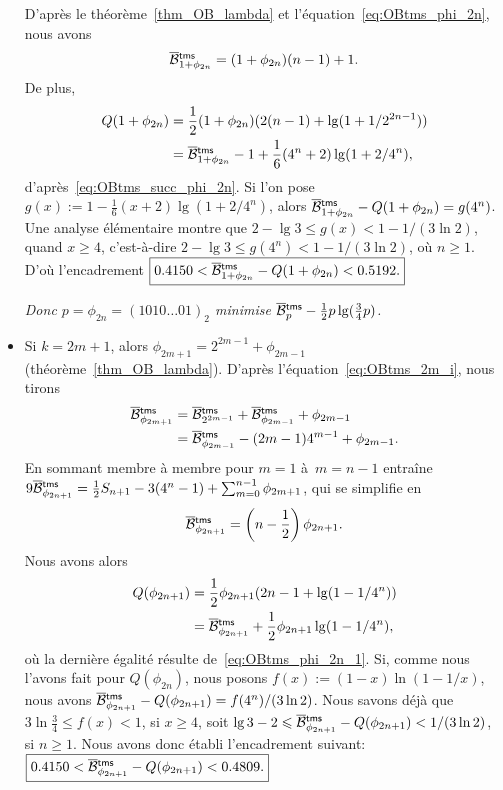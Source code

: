 \begin{itemize}
    D'après le théorème~\ref{thm_OB_lambda} et
    l'équation~\eqref{eq:OBtms_phi_2n}, nous avons
    \begin{equation}
      \OB{\fun{tms}}{1+\phi_{2n}} = (1+\phi_{2n})(n-1) + 1.
      \label{eq:OBtms_succ_phi_2n}
    \end{equation}
    De plus,
    \begin{align*}
      Q(1+\phi_{2n}) &= \frac{1}{2}(1+\phi_{2n}) (2(n-1) + \lg(1+1/2^{2n-1}))\\
                    &= \OB{\fun{tms}}{1+\phi_{2n}} - 1 +
      \frac{1}{6}(4^n + 2)\lg(1+2/4^n),
    \end{align*}
    d'après~\eqref{eq:OBtms_succ_phi_2n}. Si l'on pose \(g(x) := 1 -
    \tfrac{1}{6}(x+2)\lg(1+2/4^n)\), alors
    \(\OB{\fun{tms}}{1+\phi_{2n}} - Q(1+\phi_{2n}) = g(4^n)\). Une
    analyse élémentaire montre que \(2 - \lg 3 \leqslant g(x) < 1 -
    1/(3\ln 2)\), quand \(x \geqslant 4\), c'est-à-dire \(2 - \lg 3
    \leqslant g(4^n) < 1 - 1/(3\ln 2)\), où \(n \geqslant 1\). D'où
    l'encadrement \(\boxed{0.4150 < \OB{\fun{tms}}{1+\phi_{2n}} -
      Q(1+\phi_{2n}) < 0.5192.}\)

  \bigskip
  \textsl{Donc \(p=\phi_{2n} = (1010\dots01)_2\) minimise
      \(\OB{\fun{tms}}{p} - \tfrac{1}{2}p\lg(\tfrac{3}{4}p)\).}
  \bigskip

  \item Si \(k=2m+1\), alors \(\phi_{2m+1} = 2^{2m-1} + \phi_{2m-1}\)
    (théorème~\ref{thm_OB_lambda}). D'après
    l'équation~\eqref{eq:OBtms_2m_i}, nous tirons
    \begin{align*}
      \OB{\fun{tms}}{\phi_{2m+1}} &= \OB{\fun{tms}}{2^{2m-1}} +
      \OB{\fun{tms}}{\phi_{2m-1}} + \phi_{2m-1}\\
      &= \OB{\fun{tms}}{\phi_{2m-1}} - (2m-1)4^{m-1} + \phi_{2m-1}.
    \end{align*}
    En sommant membre à membre pour \(m=1\) à~\(m=n-1\) entraîne
    \(9\OB{\fun{tms}}{\phi_{2n+1}} = \tfrac{1}{2}S_{n+1} - 3(4^n-1) +
    \sum_{m=0}^{n-1}\phi_{2m+1}\), qui se simplifie en
    \begin{equation}
      \OB{\fun{tms}}{\phi_{2n+1}} = \left(n - \frac{1}{2}\right)\phi_{2n+1}.
      \label{eq:OBtms_phi_2n_1}
    \end{equation}
    Nous avons alors
    \begin{align*}
      Q(\phi_{2n+1}) &= \frac{1}{2}\phi_{2n+1}(2n-1 + \lg(1-1/4^n))\\
      &= \OB{\fun{tms}}{\phi_{2n+1}} + \frac{1}{2}\phi_{2n+1}\lg(1-1/4^n),
    \end{align*}
    où la dernière égalité résulte de~\eqref{eq:OBtms_phi_2n_1}. Si,
    comme nous l'avons fait pour \(Q(\phi_{2n})\), nous posons \(f(x)
    := (1-x)\ln(1-1/x)\), nous avons \(\OB{\fun{tms}}{\phi_{2n+1}} -
    Q(\phi_{2n+1}) = f(4^n)/(3\ln 2)\). Nous savons déjà que
    \(3\ln\tfrac{3}{4} \leqslant f(x) < 1\), si \(x \geqslant 4\),
    soit \(\lg 3 - 2 \leqslant \OB{\fun{tms}}{\phi_{2n+1}} -
    Q(\phi_{2n+1}) < 1/(3\ln 2)\), si \(n \geqslant 1\). Nous avons
    donc établi l'encadrement suivant: \(\boxed{0.4150 <
      \OB{\fun{tms}}{\phi_{2n+1}} - Q(\phi_{2n+1}) < 0.4809.}\)


\end{itemize}
